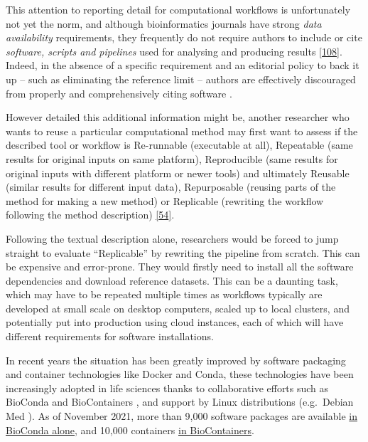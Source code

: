 {This attention to reporting detail for computational workflows is
unfortunately not yet the norm, and although bioinformatics journals
have strong \emph{data availability} requirements, they frequently do
not require authors to include or cite \emph{software, scripts and
pipelines} used for analysing and producing results
\href{https://twitter.com/soilandreyes/status/1250721245622079488}{{[}108{]}}.
Indeed, in the absence of a specific requirement and an editorial policy
to back it up -- such as eliminating the reference limit -- authors are
effectively discouraged from properly and comprehensively citing
software \cite{ch5-53}.

However detailed this additional information might be, another
researcher who wants to reuse a particular computational method may
first want to assess if the described tool or workflow is Re-runnable
(executable at all), Repeatable (same results for original inputs on
same platform), Reproducible (same results for original inputs with
different platform or newer tools) and ultimately Reusable (similar
results for different input data), Repurposable (reusing parts of the
method for making a new method) or Replicable (rewriting the workflow
following the method description)
\cite{Benureau 2017}
\href{http://repscience2016.research-infrastructures.eu/img/CaroleGoble-ReproScience2016v2.pdf}{{[}54{]}}.

Following the textual description alone, researchers would be forced to
jump straight to evaluate ``Replicable'' by rewriting the pipeline from
scratch. This can be expensive and error-prone. They would firstly need
to install all the software dependencies and download reference
datasets. This can be a daunting task, which may have to be repeated
multiple times as workflows typically are developed at small scale on
desktop computers, scaled up to local clusters, and potentially put into
production using cloud instances, each of which will have different
requirements for software installations.

In recent years the situation has been greatly improved by software
packaging and container technologies like Docker and Conda, these
technologies have been increasingly adopted in life sciences
\cite{ch5-90} thanks to
collaborative efforts such as BioConda
\cite{ch5-61} and
BioContainers
\cite{da Veiga Leprevost 2017}, and
support by Linux distributions (e.g.~Debian Med
\cite{ch5-89}). As of
November 2021, more than 9,000 software packages are available
\href{https://anaconda.org/bioconda/}{in BioConda alone}, and 10,000
containers \href{https://biocontainers.pro/\#/registry}{in
BioContainers}.

}
